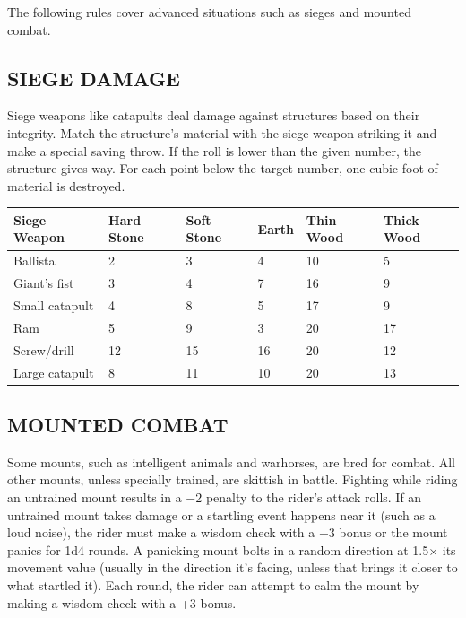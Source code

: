 \begin{multicols}{2}
The following rules cover advanced situations such as sieges and mounted combat.

\subsection{SIEGE DAMAGE}

Siege weapons like catapults deal damage against structures based on their integrity.  Match the structure's material with the siege weapon striking it and make a special saving throw.  If the roll is lower than the given number, the structure gives way.  For each point below the target number, one cubic foot of material is destroyed.

\noindent
\begin{minipage}{\columnwidth}

\label{structuralsaves}
\noindent
\begin{tabular}{|p{}|p{}|p{}|p{}|p{}|p{}|}
\hline
Siege Weapon	& Hard Stone	& Soft Stone	& Earth	& Thin Wood	& Thick Wood \\
\hline\hline
\rowcolor[gray]{.9}Ballista	& 2	& 3	& 4	& 10	& 5 \\
Giant's fist	& 3	& 4	& 7	& 16	& 9 \\
\rowcolor[gray]{.9}Small catapult	& 4	& 8	& 5	& 17	& 9 \\
Ram	& 5	& 9	& 3	& 20	& 17 \\
\rowcolor[gray]{.9}Screw/drill	& 12	& 15	& 16	& 20	& 12 \\
Large catapult	& 8	& 11	& 10	& 20	& 13 \\
\hline
\end{tabular}

\end{minipage}

\subsection{MOUNTED COMBAT}

Some mounts, such as intelligent animals and warhorses, are bred for combat.  All other mounts, unless specially trained, are skittish in battle.  Fighting while riding an untrained mount results in a $-2$ penalty to the rider's attack rolls.  If an untrained mount takes damage or a startling event happens near it (such as a loud noise), the rider must make a wisdom check with a +3 bonus or the mount panics for 1d4 rounds.  A panicking mount bolts in a random direction at 1.5$\times$ its movement value (usually in the direction it's facing, unless that brings it closer to what startled it).  Each round, the rider can attempt to calm the mount by making a wisdom check with a +3 bonus.


\end{multicols}
